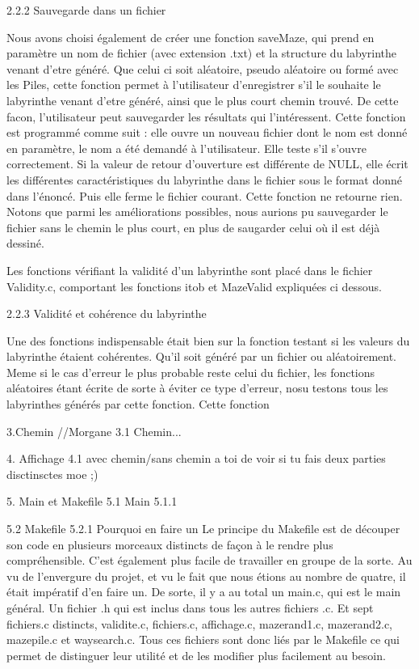 2.2.2 Sauvegarde dans un fichier
 
Nous avons choisi également de créer une fonction saveMaze, qui prend en paramètre un nom de fichier (avec extension .txt) et la structure du labyrinthe venant d'etre généré. Que celui ci soit aléatoire, pseudo aléatoire ou formé avec les Piles, cette fonction permet à l'utilisateur d'enregistrer s'il le souhaite le labyrinthe venant d'etre généré, ainsi que le plus court chemin trouvé. De cette facon, l'utilisateur peut sauvegarder les résultats qui l'intéressent.
Cette fonction est programmé comme suit : elle ouvre un nouveau fichier dont le nom est donné en paramètre, le nom a été demandé à l'utilisateur. Elle teste s'il s'ouvre correctement. Si la valeur de retour d'ouverture est différente de NULL, elle écrit les différentes caractéristiques du labyrinthe dans le fichier sous le format donné dans l'énoncé. Puis elle ferme le fichier courant. Cette fonction ne retourne rien.
Notons que parmi les améliorations possibles, nous aurions pu sauvegarder le fichier sans le chemin le plus court, en plus de saugarder celui où il est déjà dessiné.

Les fonctions vérifiant la validité d'un labyrinthe sont placé dans le fichier Validity.c, comportant les fonctions itob et MazeValid expliquées ci dessous.

2.2.3 Validité et cohérence du labyrinthe

Une des fonctions indispensable était bien sur la fonction testant si les valeurs du labyrinthe étaient cohérentes. Qu'il soit généré par un fichier ou aléatoirement. Meme si le cas d'erreur le plus probable reste celui du fichier, les fonctions aléatoires étant écrite de sorte à éviter ce type d'erreur, nosu testons tous les labyrinthes générés par cette fonction. Cette fonction 




3.Chemin //Morgane
3.1 Chemin...

4. Affichage 
4.1 avec chemin/sans chemin a toi de voir si tu fais deux parties disctinsctes moe ;)

5. Main et Makefile
5.1 Main
5.1.1



5.2 Makefile
5.2.1 Pourquoi en faire un
Le principe du Makefile est de découper son code en plusieurs morceaux distincts de façon à le rendre plus compréhensible.
C'est également plus facile de travailler en groupe de la sorte. 
Au vu de l'envergure du projet, et vu le fait que nous étions au nombre de quatre, il était impératif d'en faire un. 
De sorte, il y a au total un main.c, qui est le main général. Un fichier .h qui est inclus dans tous les autres fichiers .c.  
Et sept fichiers.c distincts, validite.c, fichiers.c, affichage.c, mazerand1.c, mazerand2.c, mazepile.c et waysearch.c.
Tous ces fichiers sont donc liés par le Makefile ce qui permet de distinguer leur utilité et de les modifier plus facilement au besoin.


